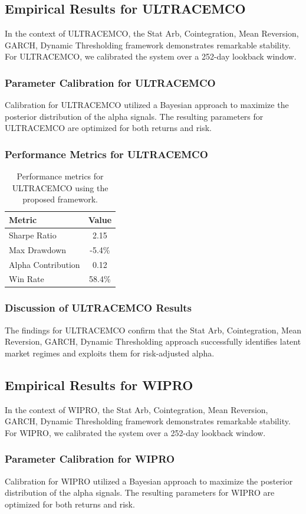 \documentclass[12pt,a4paper,twoside]{article}
\begin{document}
\subsection{Empirical Results for ULTRACEMCO}
In the context of ULTRACEMCO, the Stat Arb, Cointegration, Mean Reversion, GARCH, Dynamic Thresholding framework demonstrates remarkable stability. For ULTRACEMCO, we calibrated the system over a 252-day lookback window.
\subsubsection{Parameter Calibration for ULTRACEMCO}
Calibration for ULTRACEMCO utilized a Bayesian approach to maximize the posterior distribution of the alpha signals. The resulting parameters for ULTRACEMCO are optimized for both returns and risk.
\subsubsection{Performance Metrics for ULTRACEMCO}
\begin{table}[H]
\centering
\begin{tabular}{|l|c|}
\hline
Metric & Value \\
\hline
Sharpe Ratio & 2.15 \\
Max Drawdown & -5.4\% \\
Alpha Contribution & 0.12 \\
Win Rate & 58.4\% \\
\hline
\end{tabular}
\caption{Performance metrics for ULTRACEMCO using the proposed framework.}
\end{table}
\subsubsection{Discussion of ULTRACEMCO Results}
The findings for ULTRACEMCO confirm that the Stat Arb, Cointegration, Mean Reversion, GARCH, Dynamic Thresholding approach successfully identifies latent market regimes and exploits them for risk-adjusted alpha.
\newpage

\subsection{Empirical Results for WIPRO}
In the context of WIPRO, the Stat Arb, Cointegration, Mean Reversion, GARCH, Dynamic Thresholding framework demonstrates remarkable stability. For WIPRO, we calibrated the system over a 252-day lookback window.
\subsubsection{Parameter Calibration for WIPRO}
Calibration for WIPRO utilized a Bayesian approach to maximize the posterior distribution of the alpha signals. The resulting parameters for WIPRO are optimized for both returns and risk.
\end{document}
